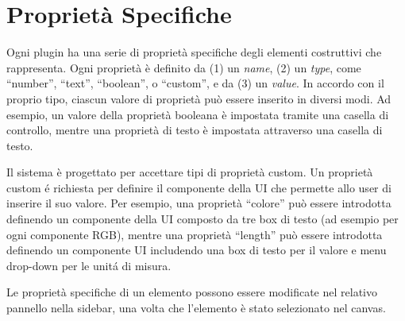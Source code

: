 \section{Propriet\`a Specifiche}
\label{sec:chapter_3_section_3}

\noindent

Ogni plugin ha una serie di propriet\`a specifiche degli elementi costruttivi che rappresenta.
Ogni propriet\`a \`e definito da (1) un \emph{name}, (2) un \emph{type}, come ``number'', ``text'', ``boolean'', o ``custom'',
e da  (3) un \emph{value}.
In accordo con il proprio tipo, ciascun valore di proprietà può essere inserito in diversi modi.
Ad esempio, un valore della proprietà booleana è impostata tramite una casella di controllo,
mentre una proprietà di testo è impostata attraverso una casella di testo.

Il sistema \`e progettato per accettare tipi di propriet\`a custom. Un propriet\`a custom \'e richiesta per definire
il componente della UI che permette allo user di inserire il suo valore.
Per esempio, una propriet\`a ``colore'' pu\`o essere introdotta definendo un componente della UI composto da tre box di testo
(ad esempio per ogni componente RGB), mentre una propriet\`a ``length'' pu\`o essere introdotta definendo un componente UI
includendo una box di testo per il valore e menu drop-down per le unit\'a di misura.

Le propriet\`a specifiche di un elemento possono essere modificate nel relativo pannello nella sidebar, una volta che l'elemento
\`e stato selezionato nel canvas.



